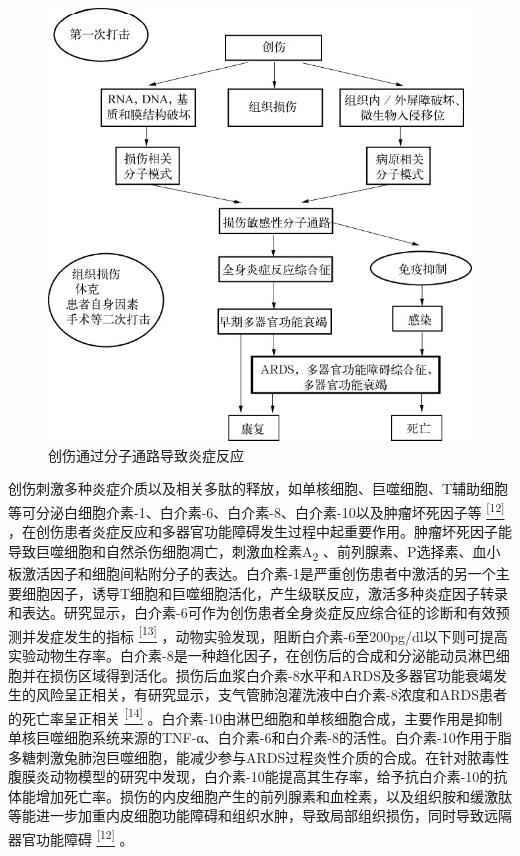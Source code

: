 \begin{figure}[!htbp]
 \centering
 \includegraphics{./images/Image00140.jpg}
 \captionsetup{justification=centering}
 \caption{创伤通过分子通路导致炎症反应}
 \label{fig18-1}
  \end{figure} 

创伤刺激多种炎症介质以及相关多肽的释放，如单核细胞、巨噬细胞、T辅助细胞等可分泌白细胞介素-1、白介素-6、白介素-8、白介素-10以及肿瘤坏死因子等
\protect\hyperlink{text00024.htmlux5cux23ch12-23}{\textsuperscript{{[}12{]}}}
，在创伤患者炎症反应和多器官功能障碍发生过程中起重要作用。肿瘤坏死因子能导致巨噬细胞和自然杀伤细胞凋亡，刺激血栓素A\textsubscript{2}
、前列腺素、P选择素、血小板激活因子和细胞间粘附分子的表达。白介素-1是严重创伤患者中激活的另一个主要细胞因子，诱导T细胞和巨噬细胞活化，产生级联反应，激活多种炎症因子转录和表达。研究显示，白介素-6可作为创伤患者全身炎症反应综合征的诊断和有效预测并发症发生的指标
\protect\hyperlink{text00024.htmlux5cux23ch13-23}{\textsuperscript{{[}13{]}}}
，动物实验发现，阻断白介素-6至200pg/dl以下则可提高实验动物生存率。白介素-8是一种趋化因子，在创伤后的合成和分泌能动员淋巴细胞并在损伤区域得到活化。损伤后血浆白介素-8水平和ARDS及多器官功能衰竭发生的风险呈正相关，有研究显示，支气管肺泡灌洗液中白介素-8浓度和ARDS患者的死亡率呈正相关
\protect\hyperlink{text00024.htmlux5cux23ch14-23}{\textsuperscript{{[}14{]}}}
。白介素-10由淋巴细胞和单核细胞合成，主要作用是抑制单核巨噬细胞系统来源的TNF-α、白介素-6和白介素-8的活性。白介素-10作用于脂多糖刺激兔肺泡巨噬细胞，能减少参与ARDS过程炎性介质的合成。在针对脓毒性腹膜炎动物模型的研究中发现，白介素-10能提高其生存率，给予抗白介素-10的抗体能增加死亡率。损伤的内皮细胞产生的前列腺素和血栓素，以及组织胺和缓激肽等能进一步加重内皮细胞功能障碍和组织水肿，导致局部组织损伤，同时导致远隔器官功能障碍
\protect\hyperlink{text00024.htmlux5cux23ch12-23}{\textsuperscript{{[}12{]}}}
。

